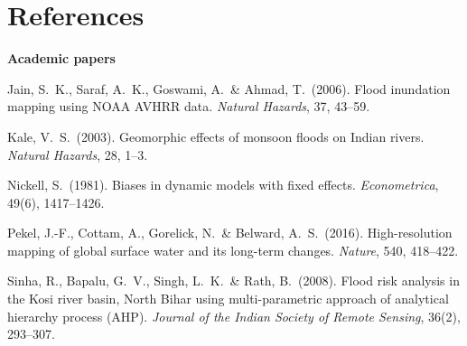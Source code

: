 \documentclass[12pt,a4paper,oneside]{report}
\begin{document}
\chapter*{References}

\noindent\textbf{Academic papers}
\begin{description}[leftmargin=2.5em,style=nextline,itemsep=2pt]
\item[--] Jain, S.~K., Saraf, A.~K., Goswami, A.\ \& Ahmad, T.\ (2006). Flood inundation mapping using NOAA AVHRR data. \textit{Natural Hazards}, 37, 43--59.
\item[--] Kale, V.~S.\ (2003). Geomorphic effects of monsoon floods on Indian rivers. \textit{Natural Hazards}, 28, 1--3.
\item[--] Nickell, S.\ (1981). Biases in dynamic models with fixed effects. \textit{Econometrica}, 49(6), 1417--1426.
\item[--] Pekel, J.-F., Cottam, A., Gorelick, N.\ \& Belward, A.~S.\ (2016). High-resolution mapping of global surface water and its long-term changes. \textit{Nature}, 540, 418--422.
\item[--] Sinha, R., Bapalu, G.~V., Singh, L.~K.\ \& Rath, B.\ (2008). Flood risk analysis in the Kosi river basin, North Bihar using multi-parametric approach of analytical hierarchy process (AHP). \textit{Journal of the Indian Society of Remote Sensing}, 36(2), 293--307.
\end{description}
\end{document}
